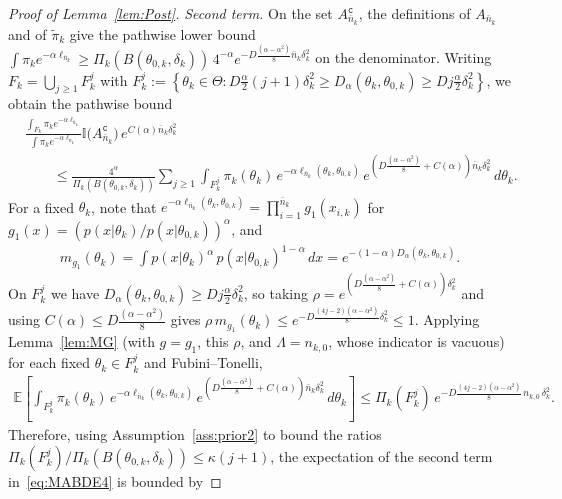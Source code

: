 \documentclass[10pt,a4paper]{amsart}
\def\bbE{\mathbb E}
\def\ind{\mathbb{I}}
\begin{document}
\begin{proof}[Proof of Lemma~\ref{lem:Post}]
\emph{Second term.} On the set $A_{\bar n_k}^\mathtt{c}$, the definitions of $A_{\bar n_k}$ and of $\tilde \pi_k$ give the pathwise lower bound $\int \pi_k e^{-\alpha \ell_{\bar n_k}} \geq \Pi_k(B\left(\theta_{0,k},\delta_k \right))\, 4^{-\alpha} e^{-D \frac{(\alpha-\alpha^2)}{8} \bar n_k \delta_k^2}$ on the denominator. Writing $F_k= \bigcup_{j\geq 1} F_k^j$ with $F_k^j := \left\{\theta_k \in \Theta: D\frac{\alpha}{2} (j+1) \delta_k^2 \geq D_{\alpha}(\theta_k,\theta_{0,k}) \geq D j \frac{\alpha}{2} \delta_k^2  \right\}$, we obtain the pathwise bound
\begin{align}
    &\frac{\int_{F_k} \pi_k e^{-\alpha \ell_{\bar n_k}}} {\int \pi_k e^{-\alpha \ell_{\bar n_k}} } \ind\big(A_{\bar n_k}^\mathtt{c}\big)\, e^{C(\alpha) \bar n_k \delta_k^2} \nonumber \\
    &\qquad \leq \frac{4^{\alpha}}{\Pi_k(B\left(\theta_{0,k},\delta_k \right))} \sum_{j \geq 1} \int_{F_k^j} \pi_k(\theta_k)\, e^{-\alpha \ell_{\bar n_k}(\theta_k,\theta_{0,k})}\, e^{\left(D \frac{(\alpha-\alpha^2)}{8} + C(\alpha)\right) \bar n_k \delta_k^2}\, d\theta_k.
    \label{eq:MABDE6}
\end{align}
For a fixed $\theta_k$, note that $e^{-\alpha \ell_{\bar n_k}(\theta_k,\theta_{0,k})} = \prod_{i=1}^{\bar n_k} g_1(x_{i,k})$ for $g_1(x) = \left( p(x|\theta_k)/p(x|\theta_{0,k})\right)^{\alpha}$, and
\begin{align}
    m_{g_1}(\theta_k) = \int p(x|\theta_k)^{\alpha}\, p(x|\theta_{0,k})^{1-\alpha}\, dx = e^{-(1-\alpha) D_{\alpha}(\theta_k,\theta_{0,k})}.
    \label{eq:Iden1}
\end{align}
On $F_k^j$ we have $D_{\alpha}(\theta_k,\theta_{0,k}) \geq D j \frac{\alpha}{2}\delta_k^2$, so taking $\rho = e^{\left(D\frac{(\alpha-\alpha^2)}{8} + C(\alpha)\right)\delta_k^2}$ and using $C(\alpha) \leq D\frac{(\alpha-\alpha^2)}{8}$ gives $\rho\, m_{g_1}(\theta_k) \leq e^{-D \frac{(4j-2)(\alpha-\alpha^2)}{8}\delta_k^2} \leq 1$. Applying Lemma~\ref{lem:MG} (with $g = g_1$, this $\rho$, and $\Lambda = n_{k,0}$, whose indicator is vacuous) for each fixed $\theta_k \in F_k^j$ and Fubini--Tonelli,
\begin{align}
    \bbE\left[ \int_{F_k^j} \pi_k(\theta_k)\, e^{-\alpha \ell_{\bar n_k}(\theta_k,\theta_{0,k})}\, e^{\left(D \frac{(\alpha-\alpha^2)}{8} + C(\alpha)\right) \bar n_k \delta_k^2}\, d\theta_k\right] \leq \Pi_k(F_k^j)\, e^{-D \frac{(4j-2)(\alpha-\alpha^2)}{8}\, n_{k,0}\, \delta_k^2 }.
    \label{eq:MABDE6.5}
\end{align}
Therefore, using Assumption~\ref{ass:prior2} to bound the ratios $\Pi_k(F_k^j)/\Pi_k(B\left(\theta_{0,k},\delta_k \right)) \leq \kappa (j+1)$, the expectation of the second term in~\eqref{eq:MABDE4} is bounded by

\end{proof}
\end{document}
